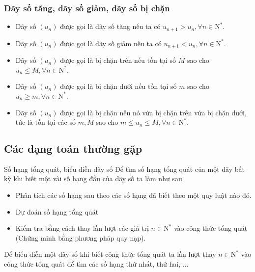 \begin{tomtat}
	\subsubsection{Dãy số tăng, dãy số giảm, dãy số bị chặn}
	\begin{itemize}
		\item Dãy số $(u_n)$ được gọi là dãy số tăng nếu ta có $u_{n+1}>u_n, \forall n \in \mathrm{N^*}$.
		\item Dãy số $(u_n)$ được gọi là dãy số giảm nếu ta có $u_{n+1}<u_n, \forall n \in \mathrm{N^*}$.
		\item Dãy số $(u_n)$ được gọi là bị chặn trên nếu tồn tại số $M$ sao cho $u_n \le M, \forall n \in \mathrm{N^*}$.
		\item Dãy số $(u_n)$ được gọi là bị chặn dưới nếu tồn tại số $m$ sao cho $u_n \ge m, \forall n \in \mathrm{N^*}$.
		\item Dãy số $(u_n)$ được gọi là bị chặn nếu nó vừa bị chặn trên vừa bị chặn dưới, tức là  tồn tại các số $m, M$ sao cho $m \le u_n \le M, \forall n \in \mathrm{N^*}$.
	\end{itemize}
\end{tomtat}

\subsection{Các dạng toán thường gặp}
\begin{dang}{Số hạng tổng quát, biểu diễn dãy số}
	Để tìm số hạng tổng quát của một dãy bất kỳ khi biết một vài số hạng đầu của dãy số ta làm như sau
	\begin{itemize}
		\item Phân tích các số hạng sau theo các số hạng đã biết theo một quy luật nào đó.
		\item Dự đoán số hạng tổng quát 
		\item Kiểm tra bằng cách thay lần lượt các giá trị $n\in \mathrm{N^*}$ vào công thức tổng quát (Chứng minh bằng phương pháp quy nạp).
	\end{itemize}
	Để biểu diễn một dãy số khi biết công thức tổng quát ta lần lượt thay $n\in \mathrm{N^*}$ vào công thức tổng quát để tìm các số hạng thứ nhất, thứ hai, $\ldots$
\end{dang}
